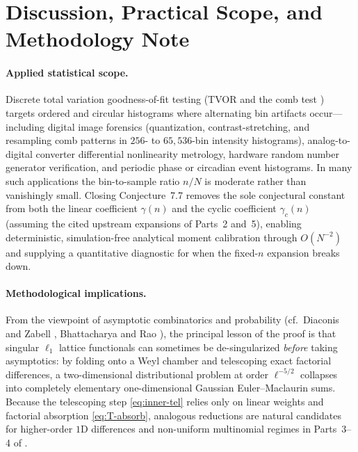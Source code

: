 \documentclass[11pt,a4paper]{article}
\numberwithin{equation}{section}
\theoremstyle{plain}
\theoremstyle{definition}
\theoremstyle{remark}
\begin{document}
\section{Discussion, Practical Scope, and Methodology Note}
\label{sec:discussion}

\paragraph{Applied statistical scope.}
Discrete total variation goodness-of-fit testing (TVOR \cite{banic_elezovic_tvor} and the comb test \cite{banic_elezovic_ct}) targets ordered and circular histograms where alternating bin artifacts occur---including digital image forensics (quantization, contrast-stretching, and resampling comb patterns in $256$- to $65{,}536$-bin intensity histograms), analog-to-digital converter differential nonlinearity metrology, hardware random number generator verification, and periodic phase or circadian event histograms. In many such applications the bin-to-sample ratio $n/N$ is moderate rather than vanishingly small. Closing Conjecture~7.7 removes the sole conjectural constant from both the linear coefficient $\gamma(n)$ and the cyclic coefficient $\gamma_c(n)$ (assuming the cited upstream expansions of Parts~2 and~5), enabling deterministic, simulation-free analytical moment calibration through $O(N^{-2})$ and supplying a quantitative diagnostic for when the fixed-$n$ expansion breaks down.

\paragraph{Methodological implications.}
From the viewpoint of asymptotic combinatorics and probability (cf.\ Diaconis and Zabell \cite{diaconis_zabell1991}, Bhattacharya and Rao \cite{bhattacharya_rao}), the principal lesson of the proof is that singular $\ell_1$ lattice functionals can sometimes be de-singularized \emph{before} taking asymptotics: by folding onto a Weyl chamber and telescoping exact factorial differences, a two-dimensional distributional problem at order $\ell^{-5/2}$ collapses into completely elementary one-dimensional Gaussian Euler--Maclaurin sums. Because the telescoping step \eqref{eq:inner-tel} relies only on linear weights and factorial absorption \eqref{eq:T-absorb}, analogous reductions are natural candidates for higher-order $1\mathrm{D}$ differences and non-uniform multinomial regimes in Parts~3--4 of \cite{banic_elezovic_p2}.
\end{document}
